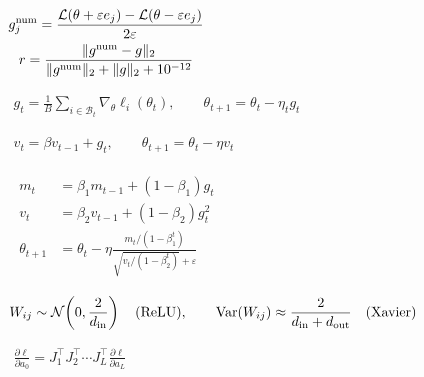 \documentclass[border=4pt,multi=preview]{standalone}
\begin{document}
\begin{preview}\color{ink}\fontsize{24}{30}\selectfont
$\displaystyle \begin{gathered}g_j^{\rm num}=\frac{\mathcal L(\theta+\varepsilon e_j)-\mathcal L(\theta-\varepsilon e_j)}{2\varepsilon}\\r=\frac{\|g^{\rm num}-g\|_2}{\|g^{\rm num}\|_2+\|g\|_2+10^{-12}}\end{gathered}$
\end{preview}
\begin{preview}\color{ink}\fontsize{24}{30}\selectfont
$\displaystyle \begin{gathered}g_t=\frac1B\sum_{i\in\mathcal B_t}\nabla_\theta\ell_i(\theta_t),\qquad\theta_{t+1}=\theta_t-\eta_tg_t\end{gathered}$
\end{preview}
\begin{preview}\color{ink}\fontsize{24}{30}\selectfont
$\displaystyle \begin{gathered}v_t=\beta v_{t-1}+g_t,\qquad\theta_{t+1}=\theta_t-\eta v_t\end{gathered}$
\end{preview}
\begin{preview}\color{ink}\fontsize{24}{30}\selectfont
$\displaystyle \begin{gathered}\begin{aligned}m_t&=\beta_1m_{t-1}+(1-\beta_1)g_t\\v_t&=\beta_2v_{t-1}+(1-\beta_2)g_t^2\\\theta_{t+1}&=\theta_t-\eta\frac{m_t/(1-\beta_1^t)}{\sqrt{v_t/(1-\beta_2^t)}+\varepsilon}\end{aligned}\end{gathered}$
\end{preview}
\begin{preview}\color{ink}\fontsize{24}{30}\selectfont
$\displaystyle \begin{gathered}W_{ij}\sim\mathcal N\!\left(0,\frac{2}{d_{\rm in}}\right)\quad\text{(ReLU)},\qquad\operatorname{Var}(W_{ij})\approx\frac{2}{d_{\rm in}+d_{\rm out}}\quad\text{(Xavier)}\end{gathered}$
\end{preview}
\begin{preview}\color{ink}\fontsize{24}{30}\selectfont
$\displaystyle \begin{gathered}\frac{\partial\ell}{\partial a_0}=J_1^\top J_2^\top\cdots J_L^\top\frac{\partial\ell}{\partial a_L}\end{gathered}$
\end{preview}
\end{document}
